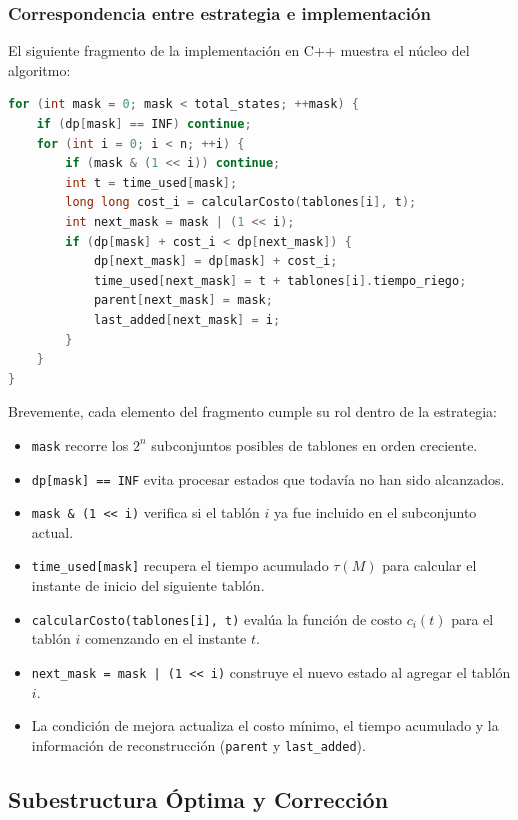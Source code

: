 \documentclass[12pt,a4paper]{article}
\newcommand{\cost}[1]{c_{#1}}
\begin{document}
\subsubsection{Correspondencia entre estrategia e implementaci\'on}

El siguiente fragmento de la implementaci\'on en C++ muestra el n\'ucleo del algoritmo:

\begin{lstlisting}[language=C++]
for (int mask = 0; mask < total_states; ++mask) {
    if (dp[mask] == INF) continue;
    for (int i = 0; i < n; ++i) {
        if (mask & (1 << i)) continue;
        int t = time_used[mask];
        long long cost_i = calcularCosto(tablones[i], t);
        int next_mask = mask | (1 << i);
        if (dp[mask] + cost_i < dp[next_mask]) {
            dp[next_mask] = dp[mask] + cost_i;
            time_used[next_mask] = t + tablones[i].tiempo_riego;
            parent[next_mask] = mask;
            last_added[next_mask] = i;
        }
    }
}
\end{lstlisting}

Brevemente, cada elemento del fragmento cumple su rol dentro de la estrategia:
\begin{itemize}
  \item \texttt{mask} recorre los \(2^n\) subconjuntos posibles de tablones en orden creciente.
  \item \texttt{dp[mask] == INF} evita procesar estados que todav\'ia no han sido alcanzados.
  \item \verb|mask & (1 << i)| verifica si el tabl\'on \(i\) ya fue incluido en el subconjunto actual.
  \item \texttt{time\_used[mask]} recupera el tiempo acumulado \(\tau(M)\) para calcular el instante de inicio del siguiente tabl\'on.
  \item \texttt{calcularCosto(tablones[i], t)} eval\'ua la funci\'on de costo \(\cost{i}(t)\) para el tabl\'on \(i\) comenzando en el instante \(t\).
  \item \verb!next_mask = mask | (1 << i)! construye el nuevo estado al agregar el tabl\'on \(i\).
  \item La condici\'on de mejora actualiza el costo m\'inimo, el tiempo acumulado y la informaci\'on de reconstrucci\'on (\texttt{parent} y \texttt{last\_added}).
\end{itemize}

\subsection{Subestructura \'Optima y Correcci\'on}
\end{document}
